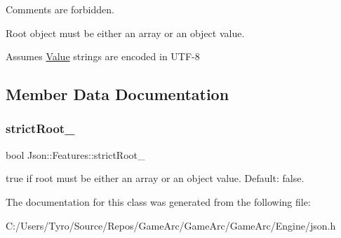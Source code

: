\begin{DoxyItemize}
\item Comments are forbidden.
\item Root object must be either an array or an object value.
\item Assumes \mbox{\hyperlink{class_json_1_1_value}{Value}} strings are encoded in U\+T\+F-\/8 
\end{DoxyItemize}

\subsection{Member Data Documentation}
\mbox{\label{class_json_1_1_features_a1162c37a1458adc32582b585b552f9c3}} 
\subsubsection{\texorpdfstring{strictRoot\_}{strictRoot\_}}
{\footnotesize\ttfamily bool Json\+::\+Features\+::strict\+Root\+\_\+}

{\ttfamily true} if root must be either an array or an object value. Default\+: {\ttfamily false}. 

The documentation for this class was generated from the following file\+:\begin{DoxyCompactItemize}
\item 
C\+:/\+Users/\+Tyro/\+Source/\+Repos/\+Game\+Arc/\+Game\+Arc/\+Game\+Arc/\+Engine/json.\+h\end{DoxyCompactItemize}
